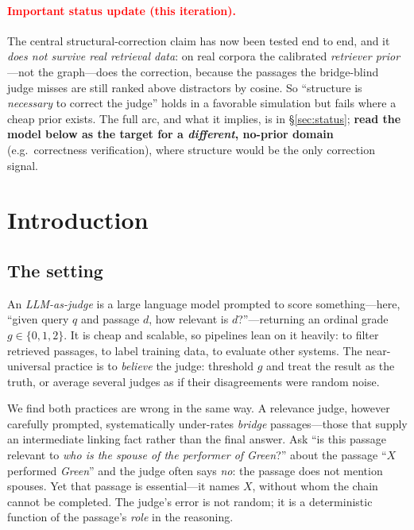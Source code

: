 \documentclass[11pt]{article}
\begin{document}
\paragraph{\textcolor{red}{Important status update (this iteration).}} The central structural-correction claim
has now been tested end to end, and it \emph{does not survive real retrieval data}: on real corpora the
calibrated \emph{retriever prior}---not the graph---does the correction, because the passages the bridge-blind
judge misses are still ranked above distractors by cosine. So ``structure is \emph{necessary} to correct the
judge'' holds in a favorable simulation but fails where a cheap prior exists. The full arc, and what it implies,
is in \S\ref{sec:status}; \textbf{read the model below as the target for a \emph{different}, no-prior domain}
(e.g.\ correctness verification), where structure would be the only correction signal.

\tableofcontents

\section{Introduction}
\subsection{The setting}
An \emph{LLM-as-judge} is a large language model prompted to score something---here, ``given query $q$ and
passage $d$, how relevant is $d$?''---returning an ordinal grade $g\in\{0,1,2\}$. It is cheap and scalable, so
pipelines lean on it heavily: to filter retrieved passages, to label training data, to evaluate other systems.
The near-universal practice is to \emph{believe} the judge: threshold $g$ and treat the result as the truth,
or average several judges as if their disagreements were random noise.

We find both practices are wrong in the same way. A relevance judge, however carefully prompted, systematically
under-rates \emph{bridge} passages---those that supply an intermediate linking fact rather than the final
answer. Ask ``is this passage relevant to \emph{who is the spouse of the performer of Green}?'' about the
passage ``$X$ performed \emph{Green}'' and the judge often says \emph{no}: the passage does not mention spouses.
Yet that passage is essential---it names $X$, without whom the chain cannot be completed. The judge's error is
not random; it is a deterministic function of the passage's \emph{role} in the reasoning.
\end{document}
